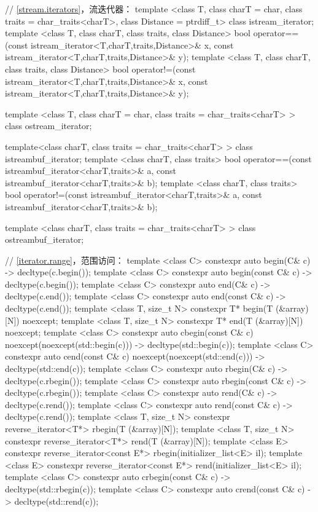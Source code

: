 \begin{codeblock}
{  // \ref{stream.iterators}，流迭代器：
  template <class T, class charT = char, class traits = char_traits<charT>,
      class Distance = ptrdiff_t>
  class istream_iterator;
  template <class T, class charT, class traits, class Distance>
    bool operator==(const istream_iterator<T,charT,traits,Distance>& x,
            const istream_iterator<T,charT,traits,Distance>& y);
  template <class T, class charT, class traits, class Distance>
    bool operator!=(const istream_iterator<T,charT,traits,Distance>& x,
            const istream_iterator<T,charT,traits,Distance>& y);

  template <class T, class charT = char, class traits = char_traits<charT> >
      class ostream_iterator;

  template<class charT, class traits = char_traits<charT> >
    class istreambuf_iterator;
  template <class charT, class traits>
    bool operator==(const istreambuf_iterator<charT,traits>& a,
            const istreambuf_iterator<charT,traits>& b);
  template <class charT, class traits>
    bool operator!=(const istreambuf_iterator<charT,traits>& a,
            const istreambuf_iterator<charT,traits>& b);

  template <class charT, class traits = char_traits<charT> >
    class ostreambuf_iterator;

  // \ref{iterator.range}，范围访问：
  template <class C> constexpr auto begin(C& c) -> decltype(c.begin());
  template <class C> constexpr auto begin(const C& c) -> decltype(c.begin());
  template <class C> constexpr auto end(C& c) -> decltype(c.end());
  template <class C> constexpr auto end(const C& c) -> decltype(c.end());
  template <class T, size_t N> constexpr T* begin(T (&array)[N]) noexcept;
  template <class T, size_t N> constexpr T* end(T (&array)[N]) noexcept;
  template <class C> constexpr auto cbegin(const C& c) noexcept(noexcept(std::begin(c)))
    -> decltype(std::begin(c));
  template <class C> constexpr auto cend(const C& c) noexcept(noexcept(std::end(c)))
    -> decltype(std::end(c));
  template <class C> constexpr auto rbegin(C& c) -> decltype(c.rbegin());
  template <class C> constexpr auto rbegin(const C& c) -> decltype(c.rbegin());
  template <class C> constexpr auto rend(C& c) -> decltype(c.rend());
  template <class C> constexpr auto rend(const C& c) -> decltype(c.rend());
  template <class T, size_t N> constexpr reverse_iterator<T*> rbegin(T (&array)[N]);
  template <class T, size_t N> constexpr reverse_iterator<T*> rend(T (&array)[N]);
  template <class E> constexpr reverse_iterator<const E*> rbegin(initializer_list<E> il);
  template <class E> constexpr reverse_iterator<const E*> rend(initializer_list<E> il);
  template <class C> constexpr auto crbegin(const C& c) -> decltype(std::rbegin(c));
  template <class C> constexpr auto crend(const C& c) -> decltype(std::rend(c));

}
\end{codeblock}
